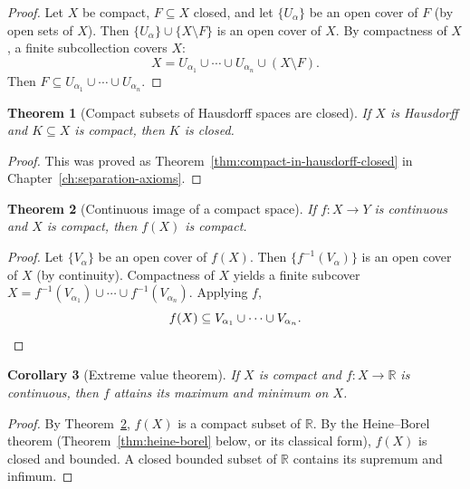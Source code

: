 \documentclass[11pt,a4paper,twoside]{book}
\newtheorem{theorem}{Theorem}[section]
\newtheorem{corollary}[theorem]{Corollary}
\theoremstyle{remark}
\theoremstyle{definition}
\theoremstyle{definition}
\begin{document}
\begin{proof}
Let $X$ be compact, $F \subseteq X$ closed, and let $\{U_\alpha\}$ be an open
cover of $F$ (by open sets of $X$).  Then
$\{U_\alpha\} \cup \{X \setminus F\}$ is an open cover of $X$.  By
compactness of $X$, a finite subcollection covers $X$:
\[
  X = U_{\alpha_1} \cup \cdots \cup U_{\alpha_n} \cup (X \setminus F).
\]
Then $F \subseteq U_{\alpha_1} \cup \cdots \cup U_{\alpha_n}$.
\end{proof}

\begin{theorem}[Compact subsets of Hausdorff spaces are closed]
\label{thm:compact-hausdorff-closed}
If $X$ is Hausdorff and $K \subseteq X$ is compact, then $K$ is closed.
\end{theorem}

\begin{proof}
This was proved as Theorem~\ref{thm:compact-in-hausdorff-closed} in
Chapter~\ref{ch:separation-axioms}.
\end{proof}

\begin{theorem}[Continuous image of a compact space]
\label{thm:continuous-image-compact}
If $f \colon X \to Y$ is continuous and $X$ is compact, then $f(X)$ is
compact.
\end{theorem}

\begin{proof}
Let $\{V_\alpha\}$ be an open cover of $f(X)$.  Then
$\{f^{-1}(V_\alpha)\}$ is an open cover of $X$ (by continuity).
Compactness of $X$ yields a finite subcover
$X = f^{-1}(V_{\alpha_1}) \cup \cdots \cup f^{-1}(V_{\alpha_n})$.
Applying $f$,
\[
  f(X) \subseteq V_{\alpha_1} \cup \cdots \cup V_{\alpha_n}. \qedhere
\]
\end{proof}

\begin{corollary}[Extreme value theorem]\label{cor:extreme-value}
If $X$ is compact and $f \colon X \to \mathbb{R}$ is continuous, then $f$
attains its maximum and minimum on $X$.
\end{corollary}

\begin{proof}
By Theorem~\ref{thm:continuous-image-compact}, $f(X)$ is a compact subset of
$\mathbb{R}$.  By the Heine--Borel theorem (Theorem~\ref{thm:heine-borel}
below, or its classical form), $f(X)$ is closed and bounded.  A closed bounded
subset of $\mathbb{R}$ contains its supremum and infimum.
\end{proof}
\end{document}

